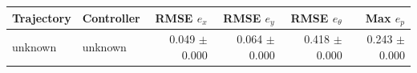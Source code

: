 \begin{tabular}{llrrrr}
\hline
Trajectory & Controller & RMSE $e_x$ & RMSE $e_y$ & RMSE $e_\theta$ & Max $e_p$ \\
\hline
unknown & unknown & 0.049 $\pm$ 0.000 & 0.064 $\pm$ 0.000 & 0.418 $\pm$ 0.000 & 0.243 $\pm$ 0.000 \\
\hline
\end{tabular}
